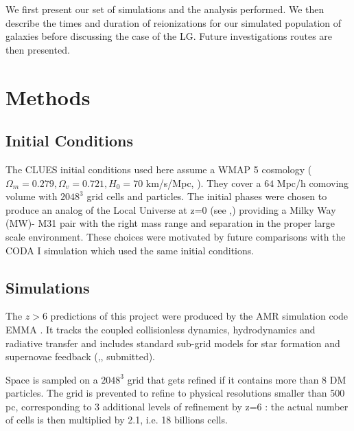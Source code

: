 \documentclass[twocolumn]{aastex61}
\begin{document}
We first present our set of simulations and the analysis performed. We then describe the times and duration of reionizations for our simulated population of galaxies before discussing the case of the LG. Future investigations routes are then presented.

\section{Methods}

\subsection{Initial Conditions}
The CLUES initial conditions used here assume a WMAP 5 cosmology ($\Omega_m=0.279, \Omega_v=0.721, H_0=70$ km/s/Mpc, \citet{HIN9}). They cover a $64$ Mpc/h comoving volume with $2048^3$ grid cells and particles.  The initial phases were chosen to produce an analog of the Local Universe at z=0 (see \citet{GOT10},\citet{ILI11}) providing a Milky Way (MW)- M31 pair with the right mass range and separation in the proper large scale environment. These choices were motivated by future comparisons with the CODA I simulation \citep{OCV16} which used the same initial conditions.

\subsection{Simulations}
The $z>6$ predictions of this project were produced by the AMR simulation code EMMA \citep{AUB15}. It tracks the coupled collisionless dynamics, hydrodynamics and radiative transfer and includes standard sub-grid models for star formation and supernovae feedback (\citet{RAS06},\citet{DEP17}, submitted). 

Space is sampled on a $2048^3$  grid that gets refined if it contains more than 8 DM particles. The grid is prevented to refine to physical resolutions smaller than 500 pc, corresponding to 3 additional levels of refinement by z=6 : the actual number of cells is then multiplied by 2.1, i.e. 18 billions cells. 
\end{document}
